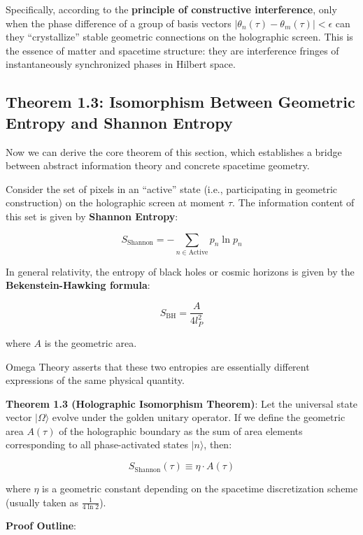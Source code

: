 Specifically, according to the \textbf{principle of constructive interference}, only when the phase difference of a group of basis vectors $|\theta_n(\tau) - \theta_m(\tau)| < \epsilon$ can they ``crystallize'' stable geometric connections on the holographic screen. This is the essence of matter and spacetime structure: they are interference fringes of instantaneously synchronized phases in Hilbert space.

\subsection{Theorem 1.3: Isomorphism Between Geometric Entropy and Shannon Entropy}

Now we can derive the core theorem of this section, which establishes a bridge between abstract information theory and concrete spacetime geometry.

Consider the set of pixels in an ``active'' state (i.e., participating in geometric construction) on the holographic screen at moment $\tau$. The information content of this set is given by \textbf{Shannon Entropy}:

\[S_{\text{Shannon}} = - \sum_{n \in \text{Active}} p_n \ln p_n\]

In general relativity, the entropy of black holes or cosmic horizons is given by the \textbf{Bekenstein-Hawking formula}:

\[S_{\text{BH}} = \frac{A}{4 l_P^2}\]

where $A$ is the geometric area.

Omega Theory asserts that these two entropies are essentially different expressions of the same physical quantity.

\textbf{Theorem 1.3 (Holographic Isomorphism Theorem)}:
Let the universal state vector $|\Omega\rangle$ evolve under the golden unitary operator. If we define the geometric area $A(\tau)$ of the holographic boundary as the sum of area elements corresponding to all phase-activated states $|n\rangle$, then:

\[S_{\text{Shannon}}(\tau) \equiv \eta \cdot A(\tau)\]

where $\eta$ is a geometric constant depending on the spacetime discretization scheme (usually taken as $\frac{1}{4 \ln 2}$).

\textbf{Proof Outline}:

